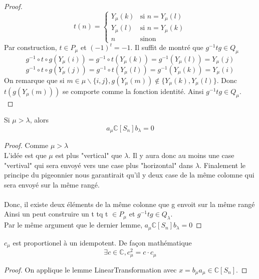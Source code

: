 \begin{proof}
    \[ t(n) = \begin{cases} Y_{\mu}(k) & \text{si } n=Y_{\mu}(l)\\
                            Y_{\mu}(l) & \text{si } n=Y_{\mu}(k)\\
                            n & \text{sinon} 
    \end{cases}\]
    Par construction, $t \in P_{\mu}$ et $(-1)^t = -1$. Il suffit de montré que $g^{-1} t g \in Q_{\mu}$
    \[ g^{-1} \circ t \circ g(Y_{\mu}(i)) = g^{-1} \circ t (Y_{\mu}(k)) = g^{-1}(Y_{\mu}(l)) = Y_{\mu}(j) \]
    \[ g^{-1} \circ t \circ g(Y_{\mu}(j)) = g^{-1} \circ t (Y_{\mu}(l)) = g^{-1}(Y_{\mu}(k)) = Y_{\mu}(i) \]
    On remarque que si $m \in \mu \backslash \{i,j\}, g(Y_{\mu}(m)) \notin \{Y_{\mu}(k), Y_{\mu}(l)\}$. Donc $t(g(Y_{\mu}(m)))$ se comporte comme la fonction identité. Ainsi $g^{-1} t g \in Q_{\mu}$.\\
\end{proof}

\begin{lemma}[SmallerImpZero]
    \label{SmallerImpZero}
    Si $\mu > \lambda$, alors\\
    \[a_{\mu} \mathbb{C}[S_{n}] b_{\lambda} = 0\]
\end{lemma}
\begin{proof}
    Comme $\mu > \lambda$\\
    L'idée est que $\mu$ est plus "vertical" que $\lambda$. Il y aura donc au moins une case "vertival" qui sera envoyé vers une case plus "horizontal" dans $\lambda$. Finalement le principe du pigeonnier nous garantirait qu'il y deux case de la même colomne qui sera envoyé sur la même rangé.\\
    \\
    Donc, il existe deux éléments de la même colonne que g envoit sur la même rangé\\
    Ainsi un peut construire un t tq t $\in P_{\mu}$ et $g^{-1} t g \in Q_{\lambda}$.\\
    Par le même argument que le dernier lemme, $a_{\mu} \mathbb{C}[S_{n}] b_{\lambda} = 0$
\end{proof}

\begin{lemma}[CuPropIdempotent]
    \label{CuPropIdempotent}
    \leanok
    $c_{\mu}$ est proportionel à un idempotent. De façon mathématique
    \[\exists c \in \mathbb{C}, c_{\mu}^{2} = c \cdot c_{\mu} \]
\end{lemma}
\begin{proof}
    On applique le lemme LinearTransformation avec $x = b_{\mu} a_{\mu} \in \mathbb{C}[S_{n}]$.
\end{proof}

